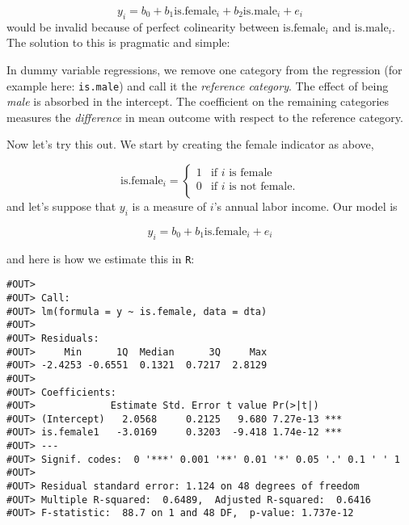 \documentclass[]{book}
\newenvironment{Shaded}{\begin{snugshade}}{\end{snugshade}}
\newcommand{\CommentTok}[1]{\textcolor[rgb]{0.56,0.35,0.01}{\textit{#1}}}
\newcommand{\KeywordTok}[1]{\textcolor[rgb]{0.13,0.29,0.53}{\textbf{#1}}}
\newcommand{\NormalTok}[1]{#1}
\newcommand{\OperatorTok}[1]{\textcolor[rgb]{0.81,0.36,0.00}{\textbf{#1}}}
\newcommand{\StringTok}[1]{\textcolor[rgb]{0.31,0.60,0.02}{#1}}
\newenvironment{tip}{\begin{tcolorbox}[colback=green!5!white,colframe=green]}{\end{tcolorbox}}
\begin{document}
\[
y_i = b_0 + b_1 \text{is.female}_i + b_2 \text{is.male}_i + e_i
\]
would be invalid because of perfect colinearity between \(\text{is.female}_i\) and \(\text{is.male}_i\). The solution to this is pragmatic and simple:

\begin{tip}
In dummy variable regressions, we remove one category from the
regression (for example here: \texttt{is.male}) and call it the
\emph{reference category}. The effect of being \emph{male} is absorbed
in the intercept. The coefficient on the remaining categories measures
the \emph{difference} in mean outcome with respect to the reference
category.
\end{tip}

Now let's try this out. We start by creating the female indicator as above,

\[
\text{is.female}_i = \begin{cases}
          1 & \text{if }i\text{ is female} \\
            0 & \text{if }i\text{ is not female}. \\
   \end{cases}
\]
and let's suppose that \(y_i\) is a measure of \(i\)'s annual labor income. Our model is

\begin{equation}
y_i = b_0 + b_1 \text{is.female}_i + e_i \label{eq:dummy-reg}
\end{equation}

and here is how we estimate this in \texttt{R}:

\begin{Shaded}
\end{Shaded}

\begin{verbatim}
#OUT> 
#OUT> Call:
#OUT> lm(formula = y ~ is.female, data = dta)
#OUT> 
#OUT> Residuals:
#OUT>     Min      1Q  Median      3Q     Max 
#OUT> -2.4253 -0.6551  0.1321  0.7217  2.8129 
#OUT> 
#OUT> Coefficients:
#OUT>             Estimate Std. Error t value Pr(>|t|)    
#OUT> (Intercept)   2.0568     0.2125   9.680 7.27e-13 ***
#OUT> is.female1   -3.0169     0.3203  -9.418 1.74e-12 ***
#OUT> ---
#OUT> Signif. codes:  0 '***' 0.001 '**' 0.01 '*' 0.05 '.' 0.1 ' ' 1
#OUT> 
#OUT> Residual standard error: 1.124 on 48 degrees of freedom
#OUT> Multiple R-squared:  0.6489,	Adjusted R-squared:  0.6416 
#OUT> F-statistic:  88.7 on 1 and 48 DF,  p-value: 1.737e-12
\end{verbatim}
\end{document}
